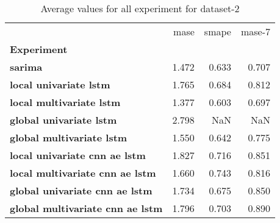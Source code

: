 \begin{table}[h]
\centering
\caption{Average values for all experiment for dataset-2}
\label{table:Average-metric-dataset-2}
\begin{tabular}{lrrr}
\toprule
{} &   mase &  smape &  mase-7 \\
\textbf{Experiment                     } &        &        &         \\
\midrule
\textbf{sarima                         } &  1.472 &  0.633 &   0.707 \\
\textbf{local univariate lstm          } &  1.765 &  0.684 &   0.812 \\
\textbf{local multivariate lstm        } &  1.377 &  0.603 &   0.697 \\
\textbf{global univariate lstm         } &  2.798 &    NaN &     NaN \\
\textbf{global multivariate lstm       } &  1.550 &  0.642 &   0.775 \\
\textbf{local univariate cnn ae lstm   } &  1.827 &  0.716 &   0.851 \\
\textbf{local multivariate cnn ae lstm } &  1.660 &  0.743 &   0.816 \\
\textbf{global univariate cnn ae lstm  } &  1.734 &  0.675 &   0.850 \\
\textbf{global multivariate cnn ae lstm} &  1.796 &  0.703 &   0.890 \\
\bottomrule
\end{tabular}
\end{table}
